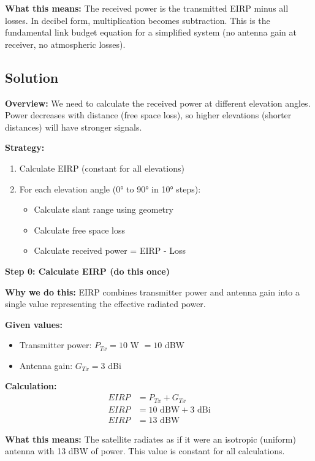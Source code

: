 \documentclass[11pt,letterpaper]{article}
\begin{document}
\textbf{What this means:} The received power is the transmitted EIRP minus all losses. In decibel form, multiplication becomes subtraction. This is the fundamental link budget equation for a simplified system (no antenna gain at receiver, no atmospheric losses).

\subsection{Solution}

\textbf{Overview:} We need to calculate the received power at different elevation angles. Power decreases with distance (free space loss), so higher elevations (shorter distances) will have stronger signals.

\textbf{Strategy:}
\begin{enumerate}
    \item Calculate EIRP (constant for all elevations)
    \item For each elevation angle (0° to 90° in 10° steps):
    \begin{itemize}
        \item Calculate slant range using geometry
        \item Calculate free space loss
        \item Calculate received power = EIRP - Loss
    \end{itemize}
\end{enumerate}

\vspace{0.3cm}

\textbf{Step 0: Calculate EIRP (do this once)}

\textbf{Why we do this:} EIRP combines transmitter power and antenna gain into a single value representing the effective radiated power.

\textbf{Given values:}
\begin{itemize}
    \item Transmitter power: $P_{Tx} = 10$ W $= 10$ dBW
    \item Antenna gain: $G_{Tx} = 3$ dBi
\end{itemize}

\textbf{Calculation:}
\begin{align}
EIRP &= P_{Tx} + G_{Tx} \\
EIRP &= 10 \text{ dBW} + 3 \text{ dBi} \\
EIRP &= 13 \text{ dBW}
\end{align}

\textbf{What this means:} The satellite radiates as if it were an isotropic (uniform) antenna with 13 dBW of power. This value is constant for all calculations.
\end{document}
